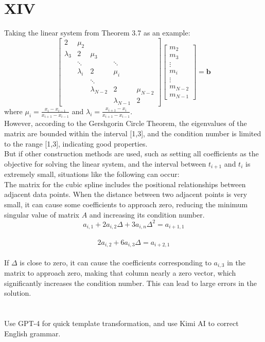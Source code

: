 \documentclass[a4paper]{article}
\begin{document}
\section*{XIV}
Taking the linear system from Theorem 3.7 as an example:\\
\[
\begin{bmatrix}
  2 & \mu_2 & & & \\
  \lambda_3 & 2 & \mu_3 & & \\
  & \ddots & & \ddots & \\
  & \lambda_i & 2 & \mu_i & \\
  & & \ddots & & \\
  & & \lambda_{N-2} & 2 & \mu_{N-2} \\
  & & & \lambda_{N-1} & 2
  \end{bmatrix}
  \begin{bmatrix}
  m_2 \\
  m_3 \\
  \vdots \\
  m_i \\
  \vdots \\
  m_{N-2} \\
  m_{N-1}
  \end{bmatrix}
  =
  \mathbf{b}
\]
where \(\mu_i = \frac{x_i - x_{i-1}}{x_{i+1} - x_{i-1}}\) and \(\lambda_i = \frac{x_{i+1} - x_i}{x_{i+1} - x_{i-1}}\).\\
However, according to the Gershgorin Circle Theorem, the eigenvalues of the matrix are bounded within the interval [1,3], and the condition number is limited to the range [1,3], indicating good properties.\\
But if other construction methods are used, such as setting all coefficients as the objective for solving the linear system, and the interval between \(t_{i+1}\) and \(t_i\) is extremely small, situations like the following can occur:\\
The matrix for the cubic spline includes the positional relationships between adjacent data points. When the distance between two adjacent points is very small, it can cause some coefficients to approach zero, reducing the minimum singular value of matrix \( A \) and increasing its condition number.\\
\[ a_{i,1} + 2a_{i,2}\Delta + 3a_{i,n}\Delta^2 = a_{i+1,1} \]\\
\[ 2a_{i,2} + 6a_{i,3}\Delta = a_{i+2,1} \]\\

If \(\Delta\) is close to zero, it can cause the coefficients corresponding to \(a_{i,3}\) in the matrix to approach zero, making that column nearly a zero vector, which significantly increases the condition number. This can lead to large errors in the solution.\\


\section*{  }
Use GPT-4 for quick template transformation, and use Kimi AI to correct English grammar.
\end{document}
